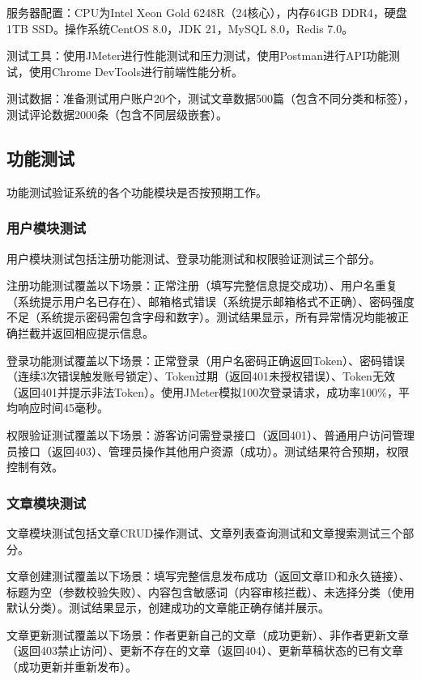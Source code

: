 \documentclass[UTF8,AutoFakeBold=1,AutoFakeSlant,zihao=-4]{SCAU}
\begin{document}
 服务器配置：CPU为Intel Xeon Gold 6248R（24核心），内存64GB DDR4，硬盘1TB SSD。操作系统CentOS 8.0，JDK 21，MySQL 8.0，Redis 7.0。

 测试工具：使用JMeter进行性能测试和压力测试，使用Postman进行API功能测试，使用Chrome DevTools进行前端性能分析。

 测试数据：准备测试用户账户20个，测试文章数据500篇（包含不同分类和标签），测试评论数据2000条（包含不同层级嵌套）。

 \subsection{功能测试}

 功能测试验证系统的各个功能模块是否按预期工作。

 \subsubsection{用户模块测试}

 用户模块测试包括注册功能测试、登录功能测试和权限验证测试三个部分。

 注册功能测试覆盖以下场景：正常注册（填写完整信息提交成功）、用户名重复（系统提示用户名已存在）、邮箱格式错误（系统提示邮箱格式不正确）、密码强度不足（系统提示密码需包含字母和数字）。测试结果显示，所有异常情况均能被正确拦截并返回相应提示信息。

 登录功能测试覆盖以下场景：正常登录（用户名密码正确返回Token）、密码错误（连续3次错误触发账号锁定）、Token过期（返回401未授权错误）、Token无效（返回401并提示非法Token）。使用JMeter模拟100次登录请求，成功率100\%，平均响应时间45毫秒。

 权限验证测试覆盖以下场景：游客访问需登录接口（返回401）、普通用户访问管理员接口（返回403）、管理员操作其他用户资源（成功）。测试结果符合预期，权限控制有效。

 \subsubsection{文章模块测试}

 文章模块测试包括文章CRUD操作测试、文章列表查询测试和文章搜索测试三个部分。

 文章创建测试覆盖以下场景：填写完整信息发布成功（返回文章ID和永久链接）、标题为空（参数校验失败）、内容包含敏感词（内容审核拦截）、未选择分类（使用默认分类）。测试结果显示，创建成功的文章能正确存储并展示。

 文章更新测试覆盖以下场景：作者更新自己的文章（成功更新）、非作者更新文章（返回403禁止访问）、更新不存在的文章（返回404）、更新草稿状态的已有文章（成功更新并重新发布）。
\end{document}
